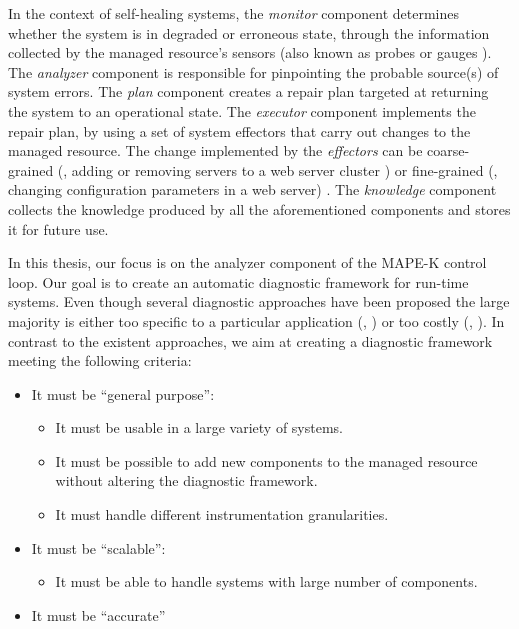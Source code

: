 In the context of self-healing systems, the \emph{monitor} component
determines whether the system is in degraded or erroneous state,
through the information collected by the managed resource's sensors
(also known as probes or gauges \citep{Garlan01}).
%
The \emph{analyzer} component is responsible for pinpointing the
probable source(s) of system errors.
%
The \emph{plan} component creates a repair plan targeted at returning
the system to an operational state.
%
The \emph{executor} component implements the repair plan, by using a set of
system effectors that carry out changes to the managed resource.
%
The change implemented by the \emph{effectors} can be coarse-grained
(\eg, adding or removing servers to a web server cluster
\citep{Garlan04}) or fine-grained (\eg, changing configuration
parameters in a web server) \citep{Bigus02}.
%
The \emph{knowledge} component collects the knowledge produced by all
the aforementioned components and stores it for future use.



In this thesis, our focus is on the analyzer component of the
\ac{MAPE-K} control loop.
%
Our goal is to create an automatic diagnostic framework for run-time
systems.
%
Even though several diagnostic approaches have been proposed the large
majority is either too specific to a particular application (\eg,
\citep{Chao04,Mohammadi07,Kasick10,Tan10,Shvachko10}) or too costly
(\eg, \citep{Reiter87,Kleer87,Mayer03,Wotawa02}).
%
In contrast to the existent approaches, we aim at creating a
diagnostic framework meeting the following criteria:
%
\begin{itemize}[nolistsep]
\item It must be ``general purpose'':
  \begin{itemize}
  \item It must be usable in a large variety of systems.
  \item It must be possible to add new components to the managed
    resource without altering the diagnostic framework.
  \item It must handle different instrumentation granularities.
  \end{itemize}

\item It must be ``scalable'':
  \begin{itemize}
  \item It must be able to handle systems with large number of
    components.
  \end{itemize}

\item It must be ``accurate''
\end{itemize}
%

